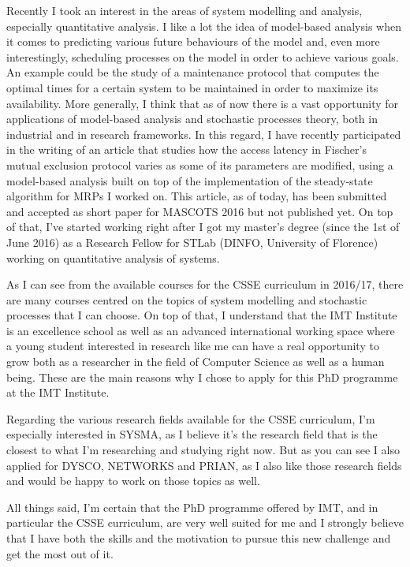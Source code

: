 \documentclass{article}
\begin{document}
    Recently I took an interest in the areas of system modelling and analysis, especially quantitative analysis. I like a lot the idea of model-based analysis when it comes to predicting various future behaviours of the model and, even more interestingly, scheduling processes on the model in order to achieve various goals. An example could be the study of a maintenance protocol that computes the optimal times for a certain system to be maintained in order to maximize its availability. More generally, I think that as of now there is a vast opportunity for applications of model-based analysis and stochastic processes theory, both in industrial and in research frameworks. In this regard, I have recently participated in the writing of an article that studies how the access latency in Fischer's mutual exclusion protocol varies as some of its parameters are modified, using a model-based analysis built on top of the implementation of the steady-state algorithm for MRPs I worked on. This article, as of today, has been submitted and accepted as short paper for MASCOTS 2016 but not published yet. On top of that, I've started working right after I got my master's degree (since the 1st of June 2016) as a Research Fellow for STLab (DINFO, University of Florence) working on quantitative analysis of systems. \par \bigskip
    
    As I can see from the available courses for the CSSE curriculum in 2016/17, there are many courses centred on the topics of system modelling and stochastic processes that I can choose. On top of that, I understand that the IMT Institute is an excellence school as well as an advanced international working space where a young student interested in research like me can have a real opportunity to grow both as a researcher in the field of Computer Science as well as a human being. These are the main reasons why I chose to apply for this PhD programme at the IMT Institute. \par \bigskip
    
    Regarding the various research fields available for the CSSE curriculum, I'm especially interested in SYSMA, as I believe it's the research field that is the closest to what I'm researching and studying right now. But as you can see I also applied for DYSCO, NETWORKS and PRIAN, as I also like those research fields and would be happy to work on those topics as well. \par \bigskip
    
    All things said, I'm certain that the PhD programme offered by IMT, and in particular the CSSE curriculum, are very well suited for me and I strongly believe that I have both the skills and the motivation to pursue this new challenge and get the most out of it. \par \bigskip
    
\end{document}
